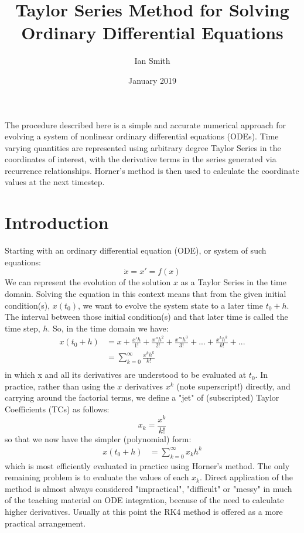 \documentclass[11pt]{article}
\title{\textbf{Taylor Series Method for Solving Ordinary Differential Equations}}
\author{Ian Smith}
\date{January 2019}
\begin{document}
\maketitle

\abstract
The procedure described here is a simple and accurate numerical approach for evolving a system of nonlinear ordinary differential equations (ODEs).
Time varying quantities are represented using arbitrary degree Taylor Series in the coordinates of interest, with the derivative terms in the series generated via recurrence relationships.
Horner's method is then used to calculate the coordinate values at the next timestep. 

\section{Introduction}
Starting with an ordinary differential equation (ODE), or system of such equations:
\begin{equation}
\dot{x} = x' = f(x)
\end{equation}
We can represent the evolution of the solution $x$ as a Taylor Series in the time domain.
Solving the equation in this context means that from the given initial condition(s), $x(t_0)$, we want to evolve the system state to a later time $t_0 + h$.
The interval between those initial condition(s) and that later time is called the time step, $h$.
So, in the time domain we have:
\begin{equation}
\begin{aligned}
x(t_0 + h) &= x + \frac{x'h}{1!} + \frac{x''h^2}{2!} + \frac{x'''h^3}{3!} + ... + \frac{x^kh^k}{k!} + ...\\
&= \sum_{k=0}^{\infty} \frac{x^kh^k}{k!}\\
\end{aligned}
\end{equation}
in which x and all its derivatives are understood to be evaluated at $t_0$.
In practice, rather than using the $x$ derivatives $x^k$ (note superscript!) directly, and carrying around the factorial terms, we define a "jet" of (subscripted) Taylor Coefficients (TCs) as follows:
\begin{equation}
x_k = \frac{x^k}{k!}
\end{equation}
so that we now have the simpler (polynomial) form:
\begin{equation}
\begin{aligned}
x(t_0 + h) &= \sum_{k=0}^{\infty} x_kh^k
\end{aligned}
\end{equation}
which is most efficiently evaluated in practice using Horner's method.
The only remaining problem is to evaluate the values of each $x_k$.
Direct application of the method is almost always considered "impractical", "difficult" or "messy" in much of the teaching material on ODE integration, because of the need to calculate higher derivatives.
Usually at this point the RK4 method is offered as a more practical arrangement.
\end{document}
